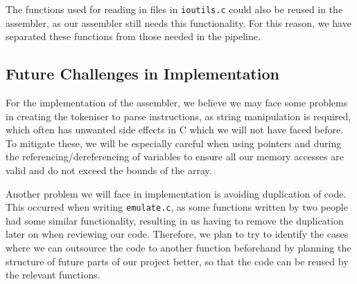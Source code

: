 \documentclass[11pt]{article}
\begin{document}
The functions used for reading in files in \texttt{ioutils.c} could also be reused in the assembler, as our assembler still needs this functionality. For this reason, we have separated these functions from those needed in the pipeline.

\subsection{Future Challenges in Implementation}

For the implementation of the assembler, we believe we may face some problems in creating the tokeniser to parse instructions, as string manipulation is required, which often has unwanted side effects in C which we will not have faced before. To mitigate these, we will be especially careful when using pointers and during the referencing/dereferencing of variables to ensure all our memory accesses are valid and do not exceed the bounds of the array.

Another problem we will face in implementation is avoiding duplication of code. This occurred when writing \texttt{emulate.c}, as some functions written by two people had some similar functionality, resulting in us having to remove the duplication later on when reviewing our code. Therefore, we plan to try to identify the cases where we can outsource the code to another function beforehand by planning the structure of future parts of our project better, so that the code can be reused by the relevant functions.

\end{document}

